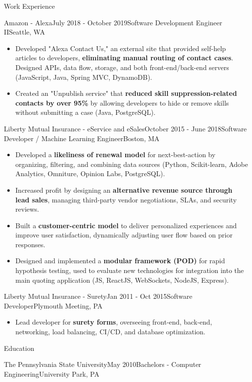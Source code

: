 \documentclass{resume} %
\begin{document}
\begin{rSection}{Work Experience}
\begin{rSubsection}{Amazon - Alexa}{July 2018 - October 2019}{Software Development Engineer II}{Seattle, WA}
\begin{itemize}
\item Developed "Alexa Contact Us," an external site that provided self-help articles to developers, \textbf{eliminating manual routing of contact cases}. Designed APIs, data flow, storage, and both front-end/back-end servers (JavaScript, Java, Spring MVC, DynamoDB).
\item Created an "Unpublish service" that \textbf{reduced skill suppression-related contacts by over 95\%} by allowing developers to hide or remove skills without submitting a case (Java, PostgreSQL).
\end{itemize}
\end{rSubsection}


\begin{rSubsection}{Liberty Mutual Insurance - eService and eSales}{October 2015 - June 2018}{Software Developer / Machine Learning Engineer}{Boston, MA}
\begin{itemize}
\item Developed a \textbf{likeliness of renewal model} for next-best-action by organizing, filtering, and combining data sources (Python, Scikit-learn, Adobe Analytics, Omniture, Opinion Labs, PostgreSQL).
 \item Increased profit by designing an \textbf{alternative revenue source through lead sales}, managing third-party vendor negotiations, SLAs, and security reviews.
 \item Built a \textbf{customer-centric model} to deliver personalized experiences and improve user satisfaction, dynamically adjusting user flow based on prior responses.
 \item Designed and implemented a \textbf{modular framework (POD)} for rapid hypothesis testing, used to evaluate new technologies for integration into the main quoting application (JS, ReactJS, WebSockets, NodeJS, Express).
\end{itemize}
\end{rSubsection}

\begin{rSubsection}{Liberty Mutual Insurance - Surety}{Jan 2011 - Oct 2015}{Software Developer}{Plymouth Meeting, PA}
\begin{itemize}
 \item Lead developer for \textbf{surety forms}, overseeing front-end, back-end, networking, load balancing, CI/CD, and database optimization.
\end{itemize}
\end{rSubsection}
\end{rSection}


\begin{rSection}{Education}
\begin{rSubsection}{The Pennsylvania State University}{May 2010}{Bachelors - Computer Engineering}{University Park, PA}

\end{rSubsection}
\end{rSection}
\end{document}
